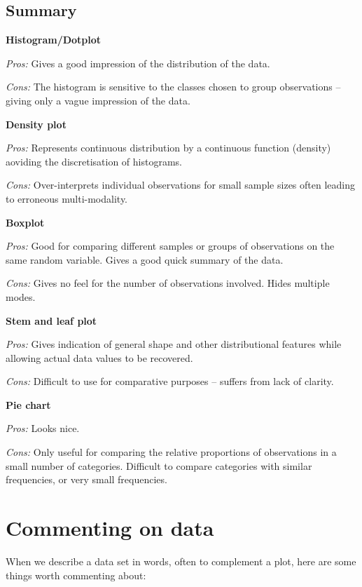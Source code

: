 \documentclass[
]{book}
\begin{document}
\hypertarget{visual_plot_summary}{%
\subsection{\texorpdfstring{{\textbf{Summary}}}{Summary}}\label{visual_plot_summary}}

{\textbf{Histogram/Dotplot}}

\emph{Pros:} Gives a good impression of the distribution of the data.

\emph{Cons:} The histogram is sensitive to the classes chosen to group
observations -- giving only a vague impression of the data.

{\textbf{Density plot}}

\emph{Pros:} Represents continuous distribution by a continuous function (density) aoviding the discretisation of histograms.

\emph{Cons:} Over-interprets individual observations for small sample sizes often leading to erroneous multi-modality.

{\textbf{Boxplot}}

\emph{Pros:} Good for comparing different samples or groups of observations on
the same random variable. Gives a good quick summary of the data.

\emph{Cons:} Gives no feel for the number of observations involved. Hides
multiple modes.

{\textbf{Stem and leaf plot}}

\emph{Pros:} Gives indication of general shape and other distributional
features while allowing actual data values to be recovered.

\emph{Cons:} Difficult to use for comparative purposes -- suffers from lack of
clarity.

{\textbf{Pie chart}}

\emph{Pros:} Looks nice.

\emph{Cons:} Only useful for comparing the relative proportions of observations
in a small number of categories. Difficult to compare categories with
similar frequencies, or very small frequencies.

\hypertarget{visual_data}{%
\section{Commenting on data}\label{visual_data}}

When we describe a data set in words, often to complement a plot, here are some things worth commenting about:
\end{document}
